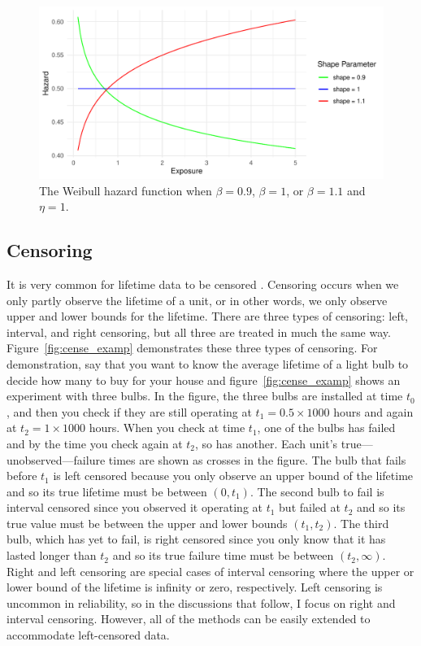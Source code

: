 \begin{figure}[h]
    \centering
    \includegraphics[width=1\textwidth]{./figures/hazard_func_demo.pdf}
    \caption{The Weibull hazard function when $\beta = 0.9$, $\beta = 1$, or $\beta = 1.1$ and $\eta = 1$.}
    \label{fig:hazard_function_demo}
\end{figure}

\subsection{Censoring} \label{subsec:censoring-treatments}

It is very common for lifetime data to be censored \citep{tian2024}. Censoring occurs when we only partly observe the lifetime of a unit, or in other words, we only observe upper and lower bounds for the lifetime. There are three types of censoring: left, interval, and right censoring, but all three are treated in much the same way. Figure~\ref{fig:cense_examp} demonstrates these three types of censoring. For demonstration, say that you want to know the average lifetime of a light bulb to decide how many to buy for your house and figure~\ref{fig:cense_examp} shows an experiment with three bulbs. In the figure, the three bulbs are installed at time $t_0$, and then you check if they are still operating at $t_1 = 0.5 \times 1000$ hours and again at $t_2 = 1 \times 1000$ hours. When you check at time $t_1$, one of the bulbs has failed and by the time you check again at $t_2$, so has another. Each unit's true---unobserved---failure times are shown as crosses in the figure. The bulb that fails before $t_1$ is left censored because you only observe an upper bound of the lifetime and so its true lifetime must be between $(0, t_1)$. The second bulb to fail is interval censored since you observed it operating at $t_1$ but failed at $t_2$ and so its true value must be between the upper and lower bounds $(t_1, t_2)$. The third bulb, which has yet to fail, is right censored since you only know that it has lasted longer than $t_2$ and so its true failure time must be between $(t_2, \infty)$. Right and left censoring are special cases of interval censoring where the upper or lower bound of the lifetime is infinity or zero, respectively. Left censoring is uncommon in reliability, so in the discussions that follow, I focus on right and interval censoring. However, all of the methods can be easily extended to accommodate left-censored data.

